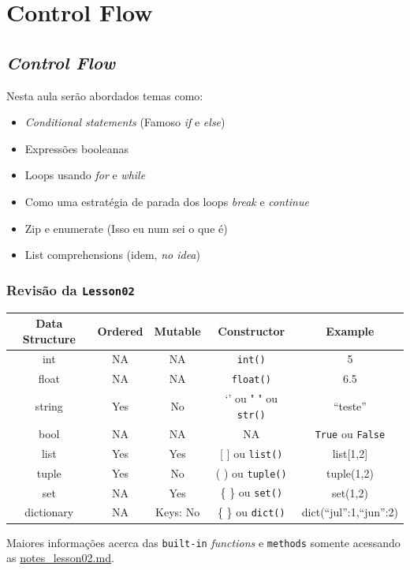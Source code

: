 \documentclass[]{book}
\providecommand{\tightlist}{%
  \setlength{\itemsep}{0pt}\setlength{\parskip}{0pt}}
\begin{document}
\section{Control Flow}\label{control-flow}

\subsection{\texorpdfstring{\emph{Control
Flow}}{Control Flow}}\label{control-flow-1}

Nesta aula serão abordados temas como:

\begin{itemize}
\tightlist
\item
  \emph{Conditional statements} (Famoso \emph{if} e \emph{else})
\item
  Expressões booleanas
\item
  Loops usando \emph{for} e \emph{while}
\item
  Como uma estratégia de parada dos loops \emph{break} e \emph{continue}
\item
  Zip e enumerate (Isso eu num sei o que é)
\item
  List comprehensions (idem, \emph{no idea})
\end{itemize}

\subsubsection{\texorpdfstring{Revisão da
\texttt{Lesson02}}{Revisão da Lesson02}}\label{revisao-da-lesson02}

\begin{longtable}[]{@{}ccccc@{}}
\toprule
Data Structure & Ordered & Mutable & Constructor &
Example\tabularnewline
\midrule
\endhead
int & NA & NA & \texttt{int()} & 5\tabularnewline
float & NA & NA & \texttt{float()} & 6.5\tabularnewline
string & Yes & No & `' ou " " ou \texttt{str()} &
``teste''\tabularnewline
bool & NA & NA & NA & \texttt{True} ou \texttt{False}\tabularnewline
list & Yes & Yes & {[} {]} ou \texttt{list()} &
list{[}1,2{]}\tabularnewline
tuple & Yes & No & ( ) ou \texttt{tuple()} & tuple(1,2)\tabularnewline
set & NA & Yes & \{ \} ou \texttt{set()} & set(1,2)\tabularnewline
dictionary & NA & Keys: No & \{ \} ou \texttt{dict()} &
dict(``jul'':1,``jun'':2)\tabularnewline
\bottomrule
\end{longtable}

Maiores informações acerca das \texttt{built-in} \emph{functions} e
\texttt{methods} somente acessando as
\href{https://github.com/AndersonUyekita/udacity_data_science_foundation_01/blob/master/02-Parte/notes_lesson02.md}{notes\_lesson02.md}.
\end{document}

